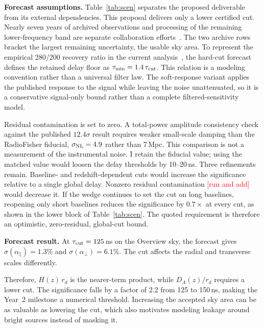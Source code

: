 \documentclass[12pt]{article}
\newcommand{\todo}[1]{\textcolor{red}{[#1]}}
\begin{document}
\textbf{Forecast assumptions.} Table~\ref{tab:scen} separates the proposed deliverable from its external dependencies. This proposal delivers only a lower certified cut. Nearly seven years of archived observations and processing of the remaining lower-frequency band are separate collaboration efforts~\cite[Sec.~2.4; Sec.~3.2.1; Sec.~8]{chime2025auto}. The two archive rows bracket the largest remaining uncertainty, the usable sky area. To represent the empirical 280/200 recovery ratio in the current analysis~\cite[Sec.~5.3; Eq.~(64); Fig.~10]{chime2025auto}, the hard-cut forecast defines the retained delay floor as $\tau_{\rm min}=1.4\,\tau_{\rm cut}$. This relation is a modeling convention rather than a universal filter law. The soft-response variant applies the published response to the signal while leaving the noise unattenuated, so it is a conservative signal-only bound rather than a complete filtered-sensitivity model.

Residual contamination is set to zero. A total-power amplitude consistency check against the published $12.4\sigma$ result requires weaker small-scale damping than the RadioFisher fiducial, $\sigma_{\rm NL}=4.9$ rather than 7\,Mpc. This comparison is not a measurement of the instrumental noise. I retain the fiducial value; using the matched value would loosen the delay thresholds by 10--20\,ns. Three refinements remain. Baseline- and redshift-dependent cuts would increase the significance relative to a single global delay. Nonzero residual contamination \todo{run and add} would decrease it. If the wedge continues to set the cut on long baselines, reopening only short baselines reduces the significance by $0.7\times$ at every cut, as shown in the lower block of Table~\ref{tab:scen}. The quoted requirement is therefore an optimistic, zero-residual, global-cut bound.

\textbf{Forecast result.} At $\tau_{\rm cut}=125$\,ns on the Overview sky, the forecast gives $\sigma(\alpha_\parallel)=1.3\%$ and $\sigma(\alpha_\perp)=6.1\%$. The cut affects the radial and transverse scales differently.\par\pagebreak

Therefore, $H(z)\,r_d$ is the nearer-term product, while $D_A(z)/r_d$ requires a lower cut. The significance falls by a factor of 2.2 from 125 to 150\,ns, making the Year~2 milestone a numerical threshold. Increasing the accepted sky area can be as valuable as lowering the cut, which also motivates modeling leakage around bright sources instead of masking it.
\end{document}
